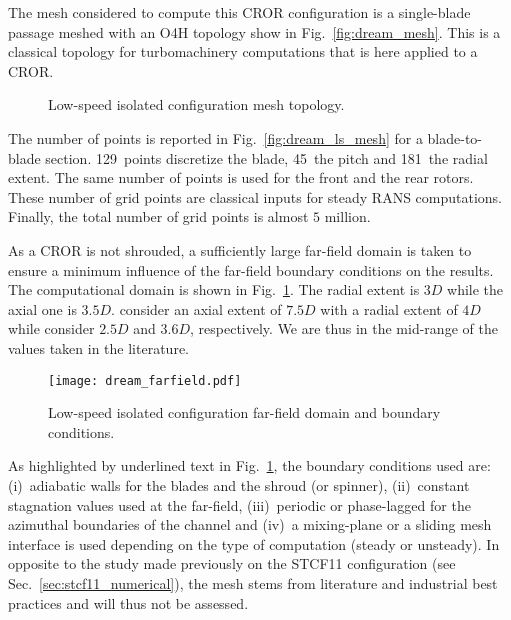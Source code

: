 
The mesh considered to compute this
CROR configuration is a single-blade passage meshed
with an O4H topology show in Fig.~\ref{fig:dream_mesh}. This is a classical
topology for turbomachinery computations that is here applied to 
a CROR.
\begin{figure}
  \centering
  \caption{Low-speed isolated configuration mesh topology.}
\end{figure}
The number of points is reported in 
Fig.~\ref{fig:dream_ls_mesh} for a blade-to-blade section. 
129~points discretize the blade, 45~the pitch and 181~the radial
extent. The same number of points is used for the front
and the rear rotors. These number of grid points are
classical inputs for steady RANS computations.
Finally, the total number of grid points is almost $5$ million.

As a CROR is not shrouded, a sufficiently large
far-field domain is taken to ensure a minimum influence
of the far-field boundary conditions on the results.
The computational domain is shown in Fig.~\ref{fig:dream_farfield}.
The radial extent is $3D$ while the axial one is $3.5D$.
\citet{Peters2012} consider an axial extent of $7.5D$
with a radial extent of $4D$ while \citet{Zachariadis2011}
consider $2.5D$ and $3.6D$, respectively. We are thus in 
the mid-range of the values taken in the literature.
\begin{figure}
  \centering
  \texttt{[image: dream\_farfield.pdf]}
  \caption{Low-speed isolated configuration far-field domain and boundary conditions.}
  \label{fig:dream_farfield}
\end{figure}
As highlighted by underlined text in Fig.~\ref{fig:dream_farfield},
the boundary conditions used are: (i)~adiabatic walls
for the blades and the shroud (or spinner), (ii)~constant
stagnation values used at the far-field, (iii)~periodic
or phase-lagged for the azimuthal boundaries of the channel
and (iv)~a mixing-plane or a sliding mesh interface is
used depending on the type of computation (steady or unsteady).
In opposite to the study made previously on the STCF11
configuration (see Sec.~\ref{sec:stcf11_numerical}),
the mesh stems from literature and industrial best
practices and will thus not be assessed.

